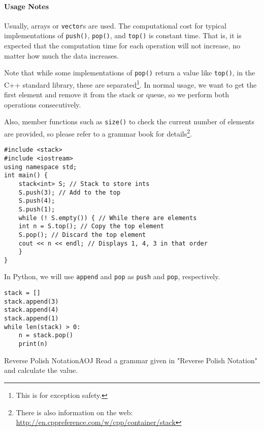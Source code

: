 \paragraph{Usage Notes}
Usually, arrays or \texttt{vector}s are used.
The computational cost for typical implementations of \texttt{push()}, \texttt{pop()}, and \texttt{top()} is constant time. That is, it is expected that the computation time for each operation will not increase, no matter how much the data increases.

Note that while some implementations of \texttt{pop()} return a value like \texttt{top()}, in the C++ standard library, these are separated\footnote{This is for exception safety.}. In normal usage, we want to get the first element and remove it from the stack or queue, so we perform both operations consecutively.

Also, member functions such as \texttt{size()} to check the current number of elements are provided, so please refer to a grammar book for details\footnote{There is also information on the web: \url{http://en.cppreference.com/w/cpp/container/stack}}.

\begin{cbox}[emph={stack,push,top,pop}]
\begin{verbatim}
#include <stack>
#include <iostream>
using namespace std;
int main() {
    stack<int> S; // Stack to store ints
    S.push(3); // Add to the top
    S.push(4);
    S.push(1);
    while (! S.empty()) { // While there are elements
	int n = S.top(); // Copy the top element
	S.pop(); // Discard the top element
	cout << n << endl; // Displays 1, 4, 3 in that order
    }
}  
\end{verbatim}
\end{cbox}

In Python, we will use \texttt{append} and \texttt{pop} as \texttt{push} and \texttt{pop}, respectively.
\begin{pybox}[emph={append,pop}]
\begin{verbatim}
stack = []
stack.append(3)
stack.append(4)
stack.append(1)
while len(stack) > 0:
    n = stack.pop()
    print(n)
\end{verbatim}
\end{pybox}

\begin{psbox}{Reverse Polish Notation}{AOJ}
Read a grammar given in "Reverse Polish Notation" and calculate the value.
  
\end{psbox}

